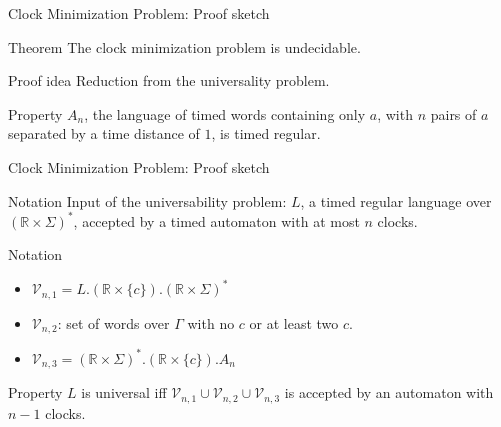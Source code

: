 \begin{frame}{Clock Minimization Problem: Proof sketch}
  
  \begin{block}{Theorem}
     The clock minimization problem is undecidable.
  \end{block}

  \begin{block}{Proof idea}
   Reduction from the universality problem.
  \end{block}

  \begin{block}{Property}
	$A_n$, the language of timed words containing only $a$, with $n$ pairs of $a$ separated by a time distance of $1$, is timed regular.
  \end{block}

\end{frame}

\begin{frame}{Clock Minimization Problem: Proof sketch}
	\begin{block}{Notation}
		Input of the universability problem: $L$, a timed regular language over $(\mathbb{R}\times\Sigma)^*$, accepted by a timed automaton with at most $n$ clocks.\\
  	\end{block}

	\begin{block}{Notation}
		\begin{itemize}
			\item $\mathcal{V}_{n,1} = L.(\mathbb{R} \times \{c\}).(\mathbb{R}\times\Sigma)^*$
			\item $\mathcal{V}_{n,2}$: set of words over $\Gamma$ with no $c$ or at least two $c$.
			\item $\mathcal{V}_{n,3} = (\mathbb{R}\times\Sigma)^*.(\mathbb{R} \times \{c\}).A_n$
		\end{itemize}
  	\end{block}

	\begin{block}{Property}
		$L$ is universal iff $\mathcal{V}_{n,1} \cup \mathcal{V}_{n,2} \cup \mathcal{V}_{n,3}$ is accepted by an automaton with $n-1$ clocks.
	\end{block}
\end{frame}

